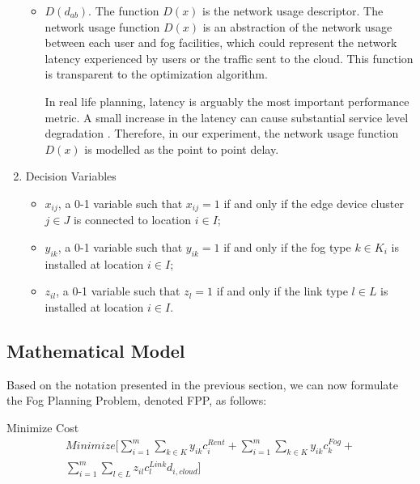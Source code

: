 \documentclass[10pt,journal,compsoc]{IEEEtran}
\begin{document}
\begin{enumerate}
\begin{itemize}
\item$D(d_{ab})$. The function $D(x)$ is the network usage descriptor. The network usage function $D(x)$ is an abstraction of the network usage between each user and fog facilities, which could represent the network latency experienced by users or the traffic sent to the cloud. This function is transparent to the optimization algorithm. %

In real life planning, latency is arguably the most important performance metric. A small increase in the latency can cause substantial service level degradation \cite{7833029,6678113}. Therefore, in our experiment, the network usage function $D(x)$ is modelled as the point to point delay. 

\end{itemize}
\item Decision Variables
\begin{itemize}
\item $x_{ij}$, a 0-1 variable such that $x_{ij} = 1$ if and only if the edge device cluster $j \in J$ is connected to location $i\in I $;
\item $y_{ik}$, a 0-1 variable such that $y_{ik} = 1$ if and only if the fog type $k \in K_i$ is installed at location $i \in I$;
\item $z_{il}$, a 0-1 variable such that $z_{l}=1$ if and only if the link type $l \in L$ is installed at location $i \in I $. 
\end{itemize}
\end{enumerate}


\subsection{Mathematical Model}\label{obj}
Based on the notation presented in the previous section, we can now formulate the Fog Planning Problem, denoted FPP, as follows:

Minimize Cost
\begin{align}\label{obj1}
\textit{Minimize}\bigg[\sum_{i=1}^{m}\sum_{k\in K} y_{ik}c^{Rent}_i +\sum_{i=1}^{m}\sum_{k\in K}  y_{ik} c^{Fog}_k +\\
\sum_{i=1}^m \sum_{l\in L} z_{il} c^{Link}_l d_{i,cloud}\bigg] %
\end{align}
\end{document}
